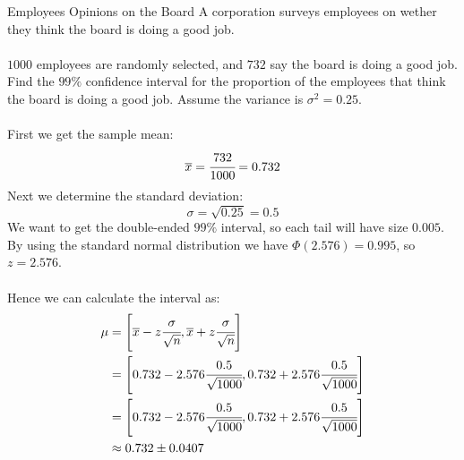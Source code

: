 \begin{examplebox}{Employees Opinions on the Board}
	A corporation surveys employees on wether they think the board is doing a good job.
	\\
	\\ $1000$ employees are randomly selected, and $732$ say the board is doing a good job. Find the $99\%$
	confidence interval for the proportion of the employees that think the board is doing a good job. Assume the variance is $\sigma^2 = 0.25$.
	\\
	\\ First we get the sample mean:
	\[\overline{x} = \cfrac{732}{1000} = 0.732\]
	Next we determine the standard deviation:
	\[\sigma = \sqrt{0.25} = 0.5\]
	We want to get the double-ended $99\%$ interval, so each tail will have size $0.005$. By using the standard normal distribution we have $\Phi(2.576) = 0.995$, so $z = 2.576$.
	\\
	\\ Hence we can calculate the interval as:
	\[\begin{split}
			\mu &= \left[\overline{x} - z\cfrac{\sigma}{\sqrt{n}}, \overline{x} + z\cfrac{\sigma}{\sqrt{n}}\right] \\
			&= \left[0.732 - 2.576\cfrac{0.5}{\sqrt{1000}}, 0.732 + 2.576\cfrac{0.5}{\sqrt{1000}}\right] \\
			&= \left[0.732 - 2.576\cfrac{0.5}{\sqrt{1000}}, 0.732 + 2.576\cfrac{0.5}{\sqrt{1000}}\right] \\
			&\approx 0.732 \pm 0.0407 \\
		\end{split}\]
\end{examplebox}


